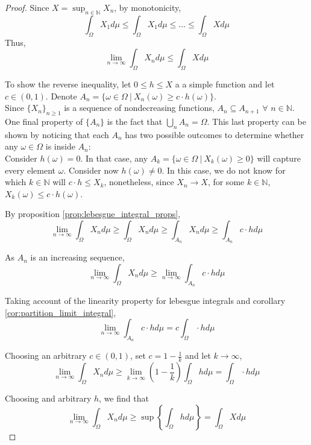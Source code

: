 \documentclass[../TGMAFFIRO.tex]{subfiles}
\begin{document}
\begin{proof}
	Since $X = \sup_{n\in \mathbb{N}}X_n$, by monotonicity,
	\begin{equation*}
		\int_\Omega X_1 d\mu \leq \int_\Omega X_1 d\mu \leq \ldots \leq \int_\Omega X d\mu
	\end{equation*}
	Thus,
	\begin{equation*}
		\lim_{n\to\infty}\int_\Omega X_n d\mu \leq \int_\Omega X d\mu
	\end{equation*}
	
	To show the reverse inequality, let $0 \leq h \leq X$ a a simple function and let $c \in (0,1)$. Denote $A_n = \{\omega\in\Omega \ | \ X_n(\omega) \geq c\cdot h(\omega)\}$.\\
	
	Since $\{X_n\}_{n\geq 1}$ is a sequence of nondecreasing functions, $A_n \subseteq A_{n+1}$ $\forall$  $n\in\mathbb{N}$. One final property of $\{A_n\}$ is the fact that $\bigcup_nA_n = \Omega$.	This last property can be shown by noticing that each $A_n$ has two possible outcomes to determine whether any $\omega\in\Omega$ is inside $A_n$:\\
	
	Consider $h(\omega)=0$. In that case, any $A_k = \{\omega\in\Omega \ | \  X_k(\omega) \geq 0\}$ will capture every element $\omega$. Consider now $h(\omega) \neq 0$. In this case, we do not know for which $k\in\mathbb{N}$ will $c\cdot h \leq X_k$, nonetheless, since $X_n \to X$, for some $k\in\mathbb N$, $X_k(\omega) \leq c\cdot h(\omega)$.
	
	By proposition \ref{prop:lebesgue_integral_props},
	\begin{equation}
		\lim_{n\to\infty}\int_\Omega X_n d\mu \geq \int_\Omega X_n d\mu \geq \int_{A_n} X_n d\mu \geq \int_{A_n} c\cdot h d\mu
	\end{equation}
	
	As $A_n$ is an increasing sequence,
	\begin{equation}
		\lim_{n\to\infty}\int_\Omega X_n d\mu \geq \lim_{n\to\infty}\int_{A_n} c\cdot h d\mu
	\end{equation}
	
	Taking account of the linearity property for lebesgue integrals and corollary \ref{cor:partition_limit_integral},
	\begin{equation}
  		\lim_{n\to\infty}\int_{A_n} c\cdot h d\mu = c\int_{\Omega} \cdot h d\mu
	\end{equation}
	
	Choosing an arbitrary $c \in (0,1)$, set $c= 1 - \frac{1}{k}$ and let $k\to\infty$,
	\begin{equation}
  		\lim_{n\to\infty}\int_\Omega X_n d\mu \geq \lim_{k\to\infty} \left(1 - \frac{1}{k}\right)\int_{\Omega} h d\mu = \int_{\Omega} \cdot h d\mu
	\end{equation}
	
	Choosing and arbitrary $h$, we find that
	\begin{equation}
  		\lim_{n\to\infty}\int_\Omega X_n d\mu \geq \sup\left\{\int_{\Omega} h d\mu\right\} = \int_\Omega X d\mu
	\end{equation}
\end{proof}
\end{document}

